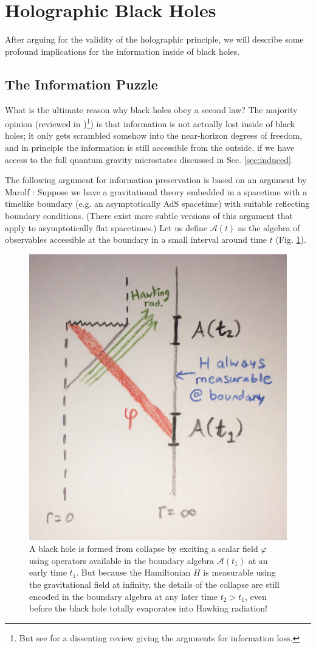 \documentclass[12pt]{article}
\begin{document}
\section{Holographic Black Holes} \label{sec:holographic}

After arguing for the validity of the holographic principle, we will describe some profound implications for the information inside of black holes.

\subsection{The Information Puzzle}

What is the ultimate reason why black holes obey a second law?  The majority opinion 
(reviewed in \cite{Polchinski:2016hrw})\footnote{But see \cite{Unruh:2017uaw} for a dissenting review giving the arguments for information loss.}) is that information is not actually lost inside of black holes; it only gets scrambled somehow into the near-horizon degrees of freedom, and in principle the information is still accessible from the outside, if we have access to the full quantum gravity microstates discussed in Sec. \ref{sec:induced}.

The following argument for information preservation is based on an argument by Marolf \cite{Marolf:2008mf,Marolf:2008mg}: Suppose we have a gravitational theory embedded in a spacetime with a timelike boundary (e.g. an asymptotically AdS spacetime) with suitable reflecting boundary conditions.  (There exist more subtle versions of this argument that apply to asymptotically flat spacetimes.)  Let us define $\mathcal{A}(t)$ as the algebra of observables accessible at the boundary in a small interval around time $t$ (Fig. \ref{fig:holo}).

\begin{figure}[ht]
\centering
\includegraphics[width=.4\textwidth]{holo.jpg}
\caption{\small A black hole is formed from collapse by exciting a scalar field $\varphi$ using operators available in the boundary algebra $\mathcal{A}(t_1)$ at an early time $t_1$.  But because the Hamiltonian $H$ is measurable using the gravitational field at infinity, the details of the collapse are still encoded in the boundary algebra at any later time $t_2 > t_1$, even before the black hole totally evaporates into Hawking radiation!}\label{fig:holo}
\end{figure}
\end{document}
